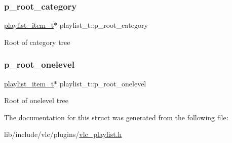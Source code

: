 \subsubsection{\texorpdfstring{p\+\_\+root\+\_\+category}{p\_root\_category}}
{\footnotesize\ttfamily \hyperlink{structplaylist__item__t}{playlist\+\_\+item\+\_\+t}$\ast$ playlist\+\_\+t\+::p\+\_\+root\+\_\+category}

Root of category tree \mbox{\label{structplaylist__t_a00fd2f3e40539a0df99ac4c8b04555af}} 
\subsubsection{\texorpdfstring{p\+\_\+root\+\_\+onelevel}{p\_root\_onelevel}}
{\footnotesize\ttfamily \hyperlink{structplaylist__item__t}{playlist\+\_\+item\+\_\+t}$\ast$ playlist\+\_\+t\+::p\+\_\+root\+\_\+onelevel}

Root of onelevel tree 

The documentation for this struct was generated from the following file\+:\begin{DoxyCompactItemize}
\item 
lib/include/vlc/plugins/\hyperlink{vlc__playlist_8h}{vlc\+\_\+playlist.\+h}\end{DoxyCompactItemize}
